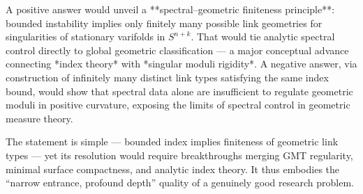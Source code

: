 A positive answer would unveil a **spectral–geometric finiteness principle**: bounded instability implies only finitely many possible link geometries for singularities of stationary varifolds in \(S^{n+k}\). That would tie analytic spectral control directly to global geometric classification — a major conceptual advance connecting *index theory* with *singular moduli rigidity*.  
A negative answer, via construction of infinitely many distinct link types satisfying the same index bound, would show that spectral data alone are insufficient to regulate geometric moduli in positive curvature, exposing the limits of spectral control in geometric measure theory.  

The statement is simple — bounded index implies finiteness of geometric link types — yet its resolution would require breakthroughs merging GMT regularity, minimal surface compactness, and analytic index theory. It thus embodies the “narrow entrance, profound depth” quality of a genuinely good research problem.